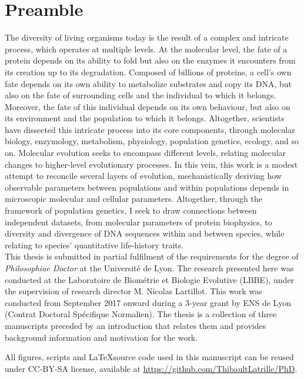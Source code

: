 \chapter*{Preamble}
The diversity of living organisms today is the result of a complex and intricate process, which operates at multiple levels.
At the molecular level, the fate of a protein depends on its ability to fold but also on the enzymes it encounters from its creation up to its degradation.
Composed of billions of proteins, a cell's own fate depends on its own ability to metabolize substrates and copy its \acrshort{DNA}, but also on the fate of surrounding cells and the individual to which it belongs.
Moreover, the fate of this individual depends on its own behaviour, but also on its environment and the population to which it belongs.
Altogether, scientists have dissected this intricate process into its core components, through molecular biology, enzymology, metabolism, physiology, population genetics, ecology, and so on.
Molecular evolution seeks to encompass different levels, relating molecular changes to higher-level evolutionary processes.
In this vein, this work is a modest attempt to reconcile several layers of evolution, mechanistically deriving how observable parameters between populations and within populations depends in microscopic molecular and cellular parameters.
Altogether, through the framework of population genetics, I seek to draw connections between independent datasets, from molecular parameters of protein biophysics, to diversity and divergence of \acrshort{DNA} sequences within and between species, while relating to species' quantitative life-history traits.\\

This thesis is submitted in partial fulfilment of the requirements for the degree of \emph{Philosophiae Doctor} at the Université de Lyon.
The research presented here was conducted at the Laboratoire de Biométrie et Biologie Evolutive (LBBE), under the supervision of research director M. Nicolas Lartillot.
This work was conducted from September 2017 onward during a 3-year grant by ENS de Lyon (Contrat Doctoral Spécifique Normalien).
The thesis is a collection of three manuscripts preceded by an introduction that relates them and provides background information and motivation for the work.

All figures, scripts and \LaTeX source code used in this manuscript can be reused under CC-BY-SA license, available at \url{https://github.com/ThibaultLatrille/PhD}.

